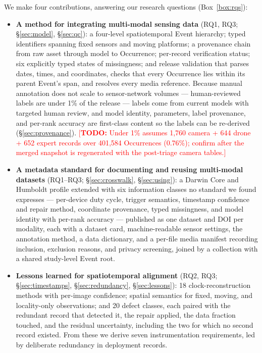 \documentclass[sigconf]{acmart}
\newcommand{\TODO}[1]{\textcolor{red}{\footnotesize[\textbf{TODO:} #1]}}
\newcommand{\TODO}[1]{}
\begin{document}
We make four contributions, answering our research questions (Box~\ref{box:rqs}):

\begin{itemize}
    \item \textbf{A method for integrating multi-modal sensing data}
    (RQ1, RQ3; \S\ref{sec:model}, \S\ref{sec:qc}): a four-level
    spatiotemporal Event hierarchy; typed identifiers spanning fixed
    sensors and moving platforms; a provenance chain from raw asset
    through model to Occurrence; per-record verification status; six
    explicitly typed states of missingness; and release validation that
    parses dates, times, and coordinates, checks that every Occurrence
    lies within its parent Event's span, and resolves every media
    reference. Because manual annotation does not scale to
    sensor-network volumes --- human-reviewed labels are under 1\% of
    the release --- labels come from current models with targeted human
    review, and model identity, parameters, label provenance, and
    per-rank accuracy are first-class content so the labels can be
    re-derived (\S\ref{sec:provenance}).
    \TODO{Under 1\% assumes 1{,}760 camera + 644 drone + 652 expert
    records over 401{,}584 Occurrences (0.76\%); confirm after the
    merged snapshot is regenerated with the post-triage camera tables.}

    \item \textbf{A metadata standard for documenting and reusing
    multi-modal datasets} (RQ1--RQ3; \S\ref{sec:crosswalk},
    \S\ref{sec:using}): a Darwin Core and Humboldt profile extended
    with six information classes no standard we found expresses ---
    per-device duty cycle, trigger semantics, timestamp confidence and
    repair method, coordinate provenance, typed missingness, and model
    identity with per-rank accuracy --- published as one dataset and DOI
    per modality, each with a dataset card, machine-readable sensor
    settings, the annotation method, a data dictionary, and a per-file
    media manifest recording inclusion, exclusion reasons, and privacy
    screening, joined by a collection with a shared study-level Event
    root.

    \item \textbf{Lessons learned for spatiotemporal alignment}
    (RQ2, RQ3; \S\ref{sec:timestamps}, \S\ref{sec:redundancy},
    \S\ref{sec:lessons}): 18 clock-reconstruction methods with
    per-image confidence; spatial semantics for fixed, moving, and
    locality-only observations; and 20 defect classes, each paired with
    the redundant record that detected it, the repair applied, the data
    fraction touched, and the residual uncertainty, including the two
    for which no second record existed. From these we derive seven
    instrumentation requirements, led by deliberate redundancy in
    deployment records.


\end{itemize}
\end{document}
